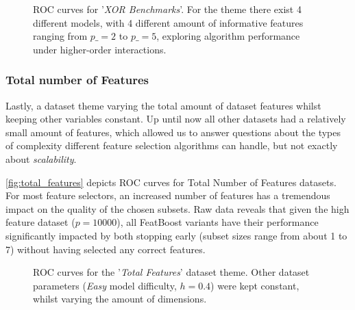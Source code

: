 \documentclass{article}
\begin{document}
\begin{figure}[ht]
\centering

\caption{ROC curves for '\textit{XOR Benchmarks}'. For the theme there exist 4 different models, with 4 different amount of informative features ranging from $p\_= 2$ to $p\_ = 5$, exploring algorithm performance under higher-order interactions.}
\label{fig:xor_benchmarks}
\end{figure}

\subsubsection{Total number of Features}
Lastly, a dataset theme varying the total amount of dataset features whilst keeping other variables constant. Up until now all other datasets had a relatively small amount of features, which allowed us to answer questions about the types of complexity different feature selection algorithms can handle, but not exactly about \textit{scalability}.

\autoref{fig:total_features} depicts ROC curves for Total Number of Features datasets. For most feature selectors, an increased number of features has a tremendous impact on the quality of the chosen subsets. Raw data reveals that given the high feature dataset ($p = 10000$), all FeatBoost variants have their performance significantly impacted by both stopping early (subset sizes range from about 1 to 7) without having selected any correct features.

\begin{figure}[ht]
\centering

\caption{ROC curves for the '\textit{Total Features}' dataset theme. Other dataset parameters (\textit{Easy} model difficulty, $h = 0.4$) were kept constant, whilst varying the amount of dimensions.}
\label{fig:total_features}
\end{figure}
\end{document}

